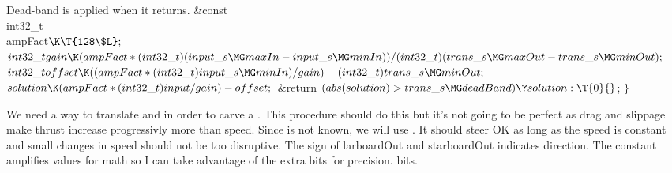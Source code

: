Dead-band is applied when it returns.
\Y\B\&{const} \\{int32\_t}\\{ampFact}${}\K\T{128\$L};{}$\7
${}\\{int32\_t}\\{gain}\K(\\{ampFact}*(\\{int32\_t})(\\{input\_s}\MG\\{maxIn}-%
\\{input\_s}\MG\\{minIn}))/(\\{int32\_t})(\\{trans\_s}\MG\\{maxOut}-\\{trans%
\_s}\MG\\{minOut});{}$\6
${}\\{int32\_t}\\{offset}\K((\\{ampFact}*(\\{int32\_t})\\{input\_s}\MG%
\\{minIn})/\\{gain})-(\\{int32\_t})\\{trans\_s}\MG\\{minOut};{}$\6
${}\\{solution}\K(\\{ampFact}*(\\{int32\_t})\\{input}/\\{gain})-\\{offset};{}$\6
\&{return} ${}(\\{abs}(\\{solution})>\\{trans\_s}\MG\\{deadBand})\?%
\\{solution}:\T{0}{}$;\7
$\}{}$\Y\par
\fi

We need a way to translate  and  in order to
carve a
. This procedure should do this but it's not going to be perfect
as
drag and slippage make thrust increase progressivly more than speed.
Since  is not known, we will use .
It should steer OK as long as the speed is constant and small changes in speed
should not be too disruptive.
The sign of larboardOut and starboardOut indicates direction.
The constant  amplifies values for math so I can take
advantage of
the extra bits for precision.
bits.

